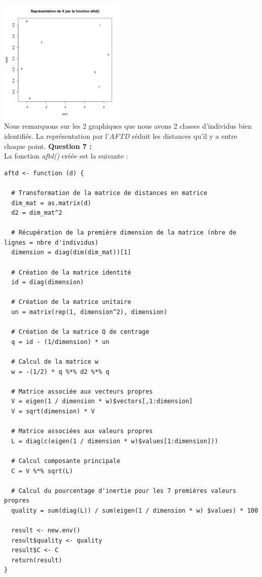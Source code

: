 \documentclass[a4paper, 10pt]{article}
\begin{document}
\includegraphics[height = 6cm, width = 6cm]{plots/plot_exo1_aftd.png}\\
Nous remarquons sur les 2 graphiques que nous avons 2 classes d'individus bien identifiés.
La représentation par l'\textit{AFTD} réduit les distances qu'il y a entre chaque point.
\newpage
\noindent
\textbf{Question 7 :}\\
La fonction \textit{aftd()} créée est la suivante :
\begin{verbatim}
aftd <- function (d) {

  # Transformation de la matrice de distances en matrice
  dim_mat = as.matrix(d)
  d2 = dim_mat^2

  # Récupération de la première dimension de la matrice (nbre de lignes = nbre d'individus)
  dimension = diag(dim(dim_mat))[1]

  # Création de la matrice identité
  id = diag(dimension)

  # Création de la matrice unitaire
  un = matrix(rep(1, dimension^2), dimension)

  # Création de la matrice Q de centrage
  q = id - (1/dimension) * un

  # Calcul de la matrice w
  w = -(1/2) * q %*% d2 %*% q

  # Matrice associée aux vecteurs propres
  V = eigen(1 / dimension * w)$vectors[,1:dimension]
  V = sqrt(dimension) * V

  # Matrice associées aux valeurs propres
  L = diag(c(eigen(1 / dimension * w)$values[1:dimension]))

  # Calcul composante principale
  C = V %*% sqrt(L)

  # Calcul du pourcentage d'inertie pour les 7 premières valeurs propres
  quality = sum(diag(L)) / sum(eigen(1 / dimension * w) $values) * 100

  result <- new.env()
  result$quality <- quality
  result$C <- C
  return(result)
}

\end{verbatim}
\end{document}
